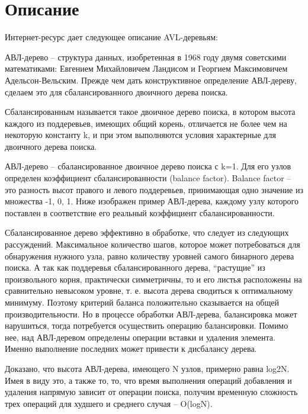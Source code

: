 \section{Описание}

Интернет-ресурс \cite{kvodo_avl_tree} дает следующее описание AVL-деревьям:

АВЛ-дерево – структура данных, изобретенная в 1968 году двумя советскими математиками: Евгением Михайловичем Ландисом и Георгием Максимовичем Адельсон-Вельским. Прежде чем дать конструктивное определение АВЛ-дереву, сделаем это для сбалансированного двоичного дерева поиска.\newline

Сбалансированным называется такое двоичное дерево поиска, в котором высота каждого из поддеревьев, имеющих общий корень, отличается не более чем на некоторую константу k, и при этом выполняются условия характерные для двоичного дерева поиска.\newline

АВЛ-дерево – сбалансированное двоичное дерево поиска с k=1. Для его узлов определен коэффициент сбалансированности (balance factor). Balance factor – это разность высот правого и левого поддеревьев, принимающая одно значение из множества {-1, 0, 1}. Ниже изображен пример АВЛ-дерева, каждому узлу которого поставлен в соответствие его реальный коэффициент сбалансированности.\newline

Сбалансированное дерево эффективно в обработке, что следует из следующих рассуждений. Максимальное количество шагов, которое может потребоваться для обнаружения нужного узла, равно количеству уровней самого бинарного дерева поиска. А так как поддеревья сбалансированного дерева, \enquote{растущие} из произвольного корня, практически симметричны, то и его листья расположены на сравнительно невысоком уровне, т. е. высота дерева сводиться к оптимальному минимуму. Поэтому критерий баланса положительно сказывается на общей производительности. Но в процессе обработки АВЛ-дерева, балансировка может нарушиться, тогда потребуется осуществить операцию балансировки. Помимо нее, над АВЛ-деревом определены операции вставки и удаления элемента. Именно выполнение последних может привести к дисбалансу дерева.\newline

Доказано, что высота АВЛ-дерева, имеющего N узлов, примерно равна log2N. Имея в виду это, а также то, то, что время выполнения операций добавления и удаления напрямую зависит от операции поиска, получим временную сложность трех операций для худшего и среднего случая  – O(logN).\newline

